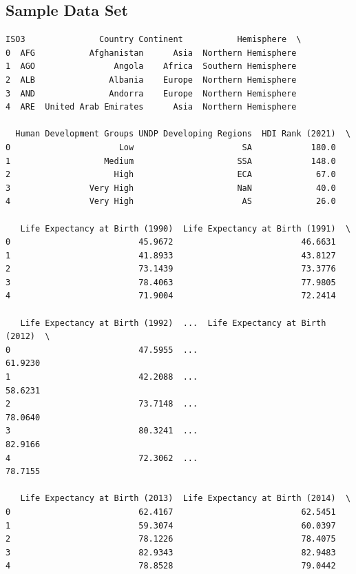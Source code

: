 \documentclass{article}
\begin{document}
\subsection{Sample Data Set}

\begin{verbatim}
ISO3               Country Continent           Hemisphere  \
0  AFG           Afghanistan      Asia  Northern Hemisphere   
1  AGO                Angola    Africa  Southern Hemisphere   
2  ALB               Albania    Europe  Northern Hemisphere   
3  AND               Andorra    Europe  Northern Hemisphere   
4  ARE  United Arab Emirates      Asia  Northern Hemisphere   

  Human Development Groups UNDP Developing Regions  HDI Rank (2021)  \
0                      Low                      SA            180.0   
1                   Medium                     SSA            148.0   
2                     High                     ECA             67.0   
3                Very High                     NaN             40.0   
4                Very High                      AS             26.0   

   Life Expectancy at Birth (1990)  Life Expectancy at Birth (1991)  \
0                          45.9672                          46.6631   
1                          41.8933                          43.8127   
2                          73.1439                          73.3776   
3                          78.4063                          77.9805   
4                          71.9004                          72.2414   

   Life Expectancy at Birth (1992)  ...  Life Expectancy at Birth (2012)  \
0                          47.5955  ...                          61.9230   
1                          42.2088  ...                          58.6231   
2                          73.7148  ...                          78.0640   
3                          80.3241  ...                          82.9166   
4                          72.3062  ...                          78.7155   

   Life Expectancy at Birth (2013)  Life Expectancy at Birth (2014)  \
0                          62.4167                          62.5451   
1                          59.3074                          60.0397   
2                          78.1226                          78.4075   
3                          82.9343                          82.9483   
4                          78.8528                          79.0442   


\end{verbatim}
\end{document}
